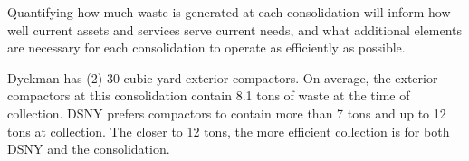 
    Quantifying how much waste is generated at each consolidation will inform how well current assets and services serve current needs, and what additional elements are necessary for each consolidation to operate as efficiently as possible.
    
    Dyckman has (2) 30-cubic yard exterior compactors. On average, the exterior compactors at this consolidation contain 8.1 tons of waste at the time of collection. DSNY prefers compactors to contain more than 7 tons and up to 12 tons at collection. The closer to 12 tons, the more efficient collection is for both DSNY and the consolidation.